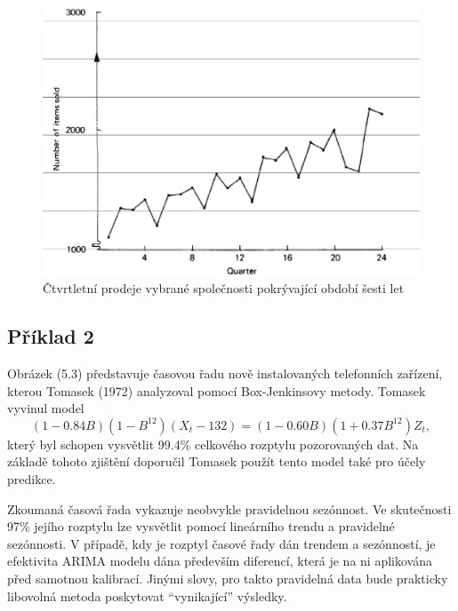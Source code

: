 \begin{figure}[htp]
\centering
\includegraphics[scale = 0.50]{pictures/figure_5_2.eps}
\caption{Čtvrtletní prodeje vybrané společnosti pokrývající období šesti let}
\label{figure_5_2}
\end{figure}

\subsection{Příklad 2}

Obrázek (5.3) představuje časovou řadu nově instalovaných telefonních zařízení, kterou Tomasek (1972) analyzoval pomocí Box-Jenkinsovy metody. Tomasek vyvinul model
\begin{equation}
(1 - 0.84 B)(1 - B^{12})(X_t - 132) = (1 - 0.60B)(1 + 0.37 B^12)Z_t,
\end{equation}
který byl schopen vysvětlit 99.4\% celkového rozptylu pozorovaných dat. Na základě tohoto zjištění doporučil Tomasek použít tento model také pro účely predikce.

Zkoumaná časová řada vykazuje neobvykle pravidelnou sezónnost. Ve skutečnosti 97\% jejího rozptylu lze vysvětlit pomocí lineárního trendu a pravidelné sezónnosti. V případě, kdy je rozptyl časové řady dán trendem a sezónností, je efektivita ARIMA modelu dána především diferencí, která je na ni aplikována před samotnou kalibrací. Jinými slovy, pro takto pravidelná data bude prakticky libovolná metoda poskytovat ``vynikající'' výsledky.

